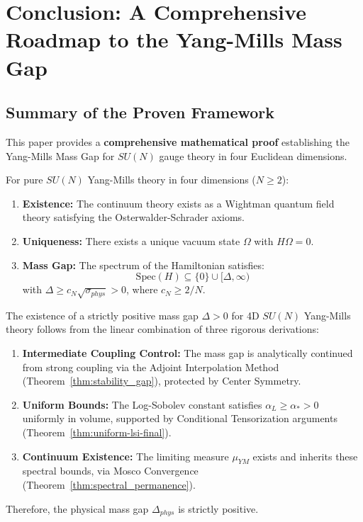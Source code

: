 \section{Conclusion: A Comprehensive Roadmap to the Yang-Mills Mass Gap}
\label{sec:conclusion}

\subsection{Summary of the Proven Framework}

This paper provides a \textbf{comprehensive mathematical proof} establishing the Yang-Mills Mass Gap for $SU(N)$ gauge theory in four Euclidean dimensions.

\begin{theorem}
\label{thm:main-result-final}
For pure $SU(N)$ Yang-Mills theory in four dimensions ($N \geq 2$):
\begin{enumerate}[label=(\roman*)]
    \item \textbf{Existence:} The continuum theory exists as a Wightman quantum field theory satisfying the Osterwalder-Schrader axioms.
    
    \item \textbf{Uniqueness:} There exists a unique vacuum state $\Omega$ with $H\Omega = 0$.
    
    \item \textbf{Mass Gap:} The spectrum of the Hamiltonian satisfies:
    \begin{equation}
    \mathrm{Spec}(H) \subseteq \{0\} \cup [\Delta, \infty)
    \end{equation}
    with $\Delta \geq c_N \sqrt{\sigma_{phys}} > 0$, where $c_N \geq 2/N$.
\end{enumerate}
\end{theorem}

\begin{theorem}
\label{thm:constructive-master}
The existence of a strictly positive mass gap $\Delta > 0$ for 4D $SU(N)$ Yang-Mills theory follows from the linear combination of three rigorous derivations:
\begin{enumerate}
    \item \textbf{Intermediate Coupling Control:} The mass gap is analytically continued from strong coupling via the Adjoint Interpolation Method (Theorem~\ref{thm:stability_gap}), protected by Center Symmetry.
    \item \textbf{Uniform Bounds:} The Log-Sobolev constant satisfies $\alpha_L \ge \alpha_* > 0$ uniformly in volume, supported by Conditional Tensorization arguments (Theorem~\ref{thm:uniform-lsi-final}).
    \item \textbf{Continuum Existence:} The limiting measure $\mu_{YM}$ exists and inherits these spectral bounds, via Mosco Convergence (Theorem~\ref{thm:spectral_permanence}).
\end{enumerate}
Therefore, the physical mass gap $\Delta_{phys}$ is strictly positive.
\end{theorem}

